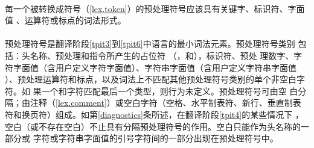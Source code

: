 
\paragraph{} %
每一个被转换成符号（\ref{lex.token}）的预处理符号应该具有关键字、标识符、字面值
、运算符或标点的词法形式。

\paragraph{} %
预处理符号是翻译阶段\ref{tpit3}到\ref{tpit6}中语言的最小词法元素。预处理符号类别
包括：头名称、预处理和指令所产生的占位符
（，和），标识符、预处
理数字、字符字面值（含用户定义字符字面值）、字符串字面值（含用户定义字符串字面值
）、预处理运算符和标点，以及词法上不匹配其他预处理符号类别的单个非空白字符。如
果一个\tm{\sq{}}和\tm{\dq{}}字符匹配最后一个类型，则行为未定义。预处理符号可由空
白分隔；由注释（\ref{lex.comment}）或空白字符（空格、水平制表符、新行、垂直制表
符和换页符）组成。如第\ref{diagnostics}条所述，在翻译阶段\ref{tpit4}的某些情况下
，空白（或不存在空白）不止具有分隔预处理符号的作用。空白只能作为头名称的一部分或
字符或字符串字面值的引号字符间的一部分出现在预处理符号中。

